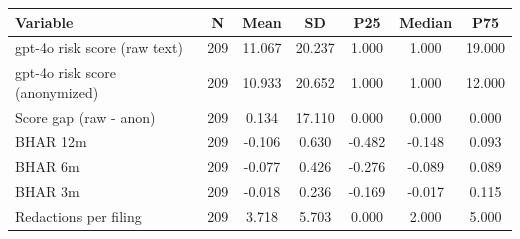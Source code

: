 \begin{tabular}{lcccccc}
\toprule
Variable & N & Mean & SD & P25 & Median & P75 \\
\midrule
gpt-4o risk score (raw text) & 209 & 11.067 & 20.237 & 1.000 & 1.000 & 19.000 \\
gpt-4o risk score (anonymized) & 209 & 10.933 & 20.652 & 1.000 & 1.000 & 12.000 \\
Score gap (raw - anon) & 209 & 0.134 & 17.110 & 0.000 & 0.000 & 0.000 \\
BHAR 12m & 209 & -0.106 & 0.630 & -0.482 & -0.148 & 0.093 \\
BHAR 6m & 209 & -0.077 & 0.426 & -0.276 & -0.089 & 0.089 \\
BHAR 3m & 209 & -0.018 & 0.236 & -0.169 & -0.017 & 0.115 \\
Redactions per filing & 209 & 3.718 & 5.703 & 0.000 & 2.000 & 5.000 \\
\bottomrule
\end{tabular}